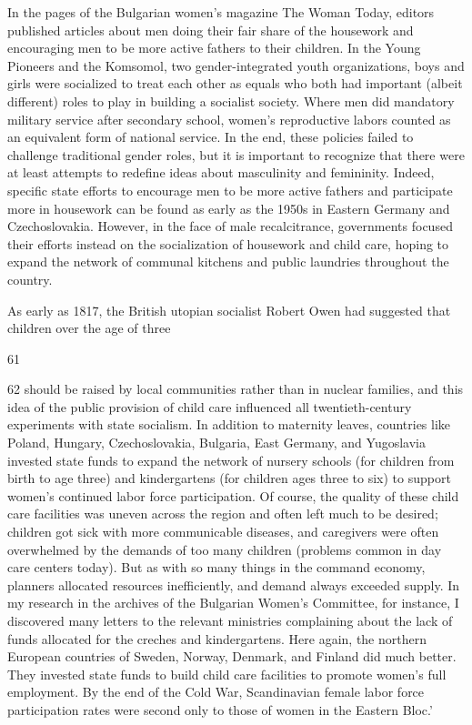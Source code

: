 In the pages of the Bulgarian women’s magazine The Woman Today, editors published articles about men doing their fair share of the housework and encouraging men to be more active fathers to their children. In the Young Pioneers and the Komsomol, two gender-integrated youth organizations, boys and girls were socialized to treat each other as equals who both had important (albeit different) roles to play in building a socialist society. Where men did mandatory military service after secondary school, women’s reproductive labors counted as an equivalent form of national service. In the end, these policies failed to challenge traditional gender roles, but it is important to recognize that there were at least attempts to redefine ideas about masculinity and femininity. Indeed, specific state efforts to encourage men to be more active fathers and participate more in housework can be found as early as the 1950s in Eastern Germany and Czechoslovakia. However, in the face of male recalcitrance, governments focused their efforts instead on the socialization of housework and child care, hoping to expand the network of communal kitchens and public laundries throughout the country.
 \par 
As early as 1817, the British utopian socialist Robert Owen had suggested that children over the age of three
 \par 
61
 \par 
62 should be raised by local communities rather than in nuclear families, and this idea of the public provision of child care influenced all twentieth-century experiments with state socialism. In addition to maternity leaves, countries like Poland, Hungary, Czechoslovakia, Bulgaria, East Germany, and Yugoslavia invested state funds to expand the network of nursery schools (for children from birth to age three) and kindergartens (for children ages three to six) to support women’s continued labor force participation. Of course, the quality of these child care facilities was uneven across the region and often left much to be desired; children got sick with more communicable diseases, and caregivers were often overwhelmed by the demands of too many children (problems common in day care centers today). But as with so many things in the command economy, planners allocated resources inefficiently, and demand always exceeded supply. In my research in the archives of the Bulgarian Women’s Committee, for instance, I discovered many letters to the relevant ministries complaining about the lack of funds allocated for the creches and kindergartens. Here again, the northern European countries of Sweden, Norway, Denmark, and Finland did much better. They invested state funds to build child care facilities to promote women’s full employment. By the end of the Cold War, Scandinavian female labor force participation rates were second only to those of women in the Eastern Bloc.’
